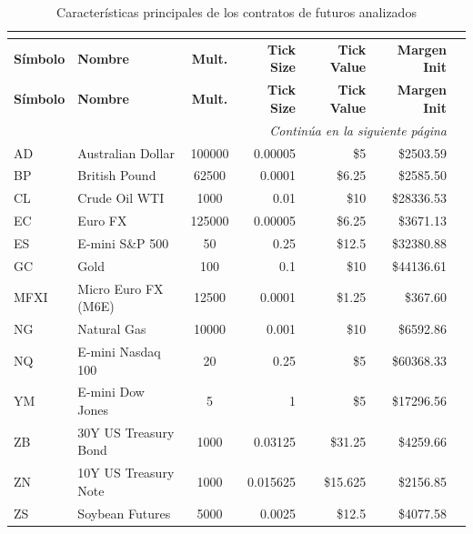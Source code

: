 \begin{longtable}{l l c r r r r}
\caption{Características principales de los contratos de futuros analizados} \\
\label{tab:futuros_caracteristicas} \\
\toprule
\textbf{Símbolo} & \textbf{Nombre} &
\textbf{Mult.} & \textbf{Tick Size} & \textbf{Tick Value} &
\textbf{Margen Init} \\
\midrule
\endfirsthead

\toprule
\textbf{Símbolo} & \textbf{Nombre} &
\textbf{Mult.} & \textbf{Tick Size} & \textbf{Tick Value} &
\textbf{Margen Init} \\
\midrule
\endhead

\midrule
\multicolumn{6}{r}{\textit{Continúa en la siguiente página}} \\
\midrule
\endfoot

\bottomrule
\endlastfoot

AD   & Australian Dollar        & 100000 & 0.00005  & \$5       & \$2503.59  \\
BP   & British Pound            & 62500  & 0.0001   & \$6.25    & \$2585.50  \\
CL   & Crude Oil WTI            & 1000   & 0.01     & \$10      & \$28336.53 \\
EC   & Euro FX                  & 125000 & 0.00005  & \$6.25    & \$3671.13  \\
ES   & E-mini S\&P 500          & 50     & 0.25     & \$12.5    & \$32380.88 \\
GC   & Gold                     & 100    & 0.1      & \$10      & \$44136.61 \\
MFXI & Micro Euro FX (M6E)      & 12500  & 0.0001   & \$1.25    & \$367.60   \\
NG   & Natural Gas              & 10000  & 0.001    & \$10      & \$6592.86  \\
NQ   & E-mini Nasdaq 100        & 20     & 0.25     & \$5       & \$60368.33 \\
YM   & E-mini Dow Jones         & 5      & 1        & \$5       & \$17296.56 \\
ZB   & 30Y US Treasury Bond     & 1000   & 0.03125  & \$31.25   & \$4259.66  \\
ZN   & 10Y US Treasury Note     & 1000   & 0.015625 & \$15.625  & \$2156.85  \\
ZS   & Soybean Futures          & 5000   & 0.0025   & \$12.5    & \$4077.58  \\
\end{longtable}

